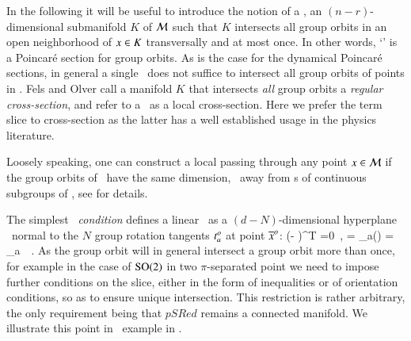 In the following it will be useful to introduce the
notion of a \emph{\slice}, an $(n-r)$-dimensional submanifold $K$
of ${\cal M}$ such that $K$ intersects all group orbits in an
open neighborhood of $x \in K$ transversally and at most once.
In other words, `\slice' is a Poincar\'e section
for group orbits. As is the case for the dynamical Poincar\'e sections,
in general a single \slice\ does not suffice to intersect all
group orbits of points in \pS. Fels and Olver
call a manifold $K$ that intersects \emph{all} group orbits a
\emph{regular cross-section}, and refer to a \slice\ as a local
cross-section. Here we prefer the term slice
to cross-section as the latter has a well established usage in the physics
literature.

Loosely speaking, one can construct a local {\slice} passing
through any point $x\in {\cal M}$ if the group orbits of \Group\
have the same dimension, \ie\ away from {\fixedsp s}
of continuous subgroups of \Group, see  for
details.

The simplest {\em \slice\ condition} defines a linear \slice\ as a
$(d\!-\!N)$-dim\-ens\-ion\-al hyperplane \pSRed\ normal to
the $N$ group rotation tangents $t^o_{a}$ at point ${\overline{x}^o}$:
\beq
(\sspRed - \slicep )^T  =0
    \,,\qquad
{} = \groupTan_a(\slicep) = \Lg_a \, \slicep
\,.
As the group orbit will in general intersect a group orbit more than
once, for example in the case of $\textrm{SO}(2)$ in two $\pi$-separated point
we need to impose further conditions on the slice, either in the form of
inequalities or of orientation conditions, so as to ensure unique intersection.
This restriction is rather arbitrary, the only requirement being that
$pSRed$ remains a connected manifold.
We illustrate this point in \cLf\ example in .

